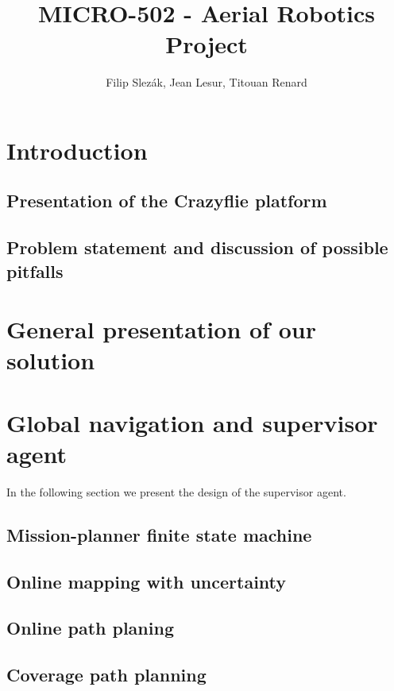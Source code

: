 \documentclass[11pt]{article}
\title{MICRO-502 - Aerial Robotics Project}
\author{Filip Slezák, Jean Lesur, Titouan Renard}
\begin{document}
\maketitle

\section{Introduction}

\subsection{Presentation of the Crazyflie platform}

\subsection{Problem statement and discussion of possible pitfalls}

\section{General presentation of our solution}

\section{Global navigation and supervisor agent}

In the following section we present the design of the supervisor agent.

\subsection{Mission-planner finite state machine}

\subsection{Online mapping with uncertainty}

\subsection{Online path planing}

\subsection{Coverage path planning}

\cite{epsilon_star} \cite{Galceran13asurvey}

\tableofcontents

\printbibliography %
\end{document}
